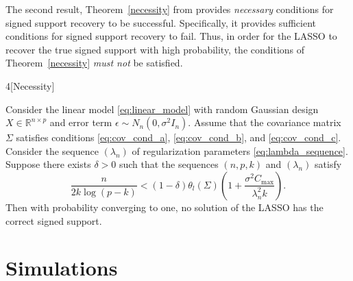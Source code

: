 \documentclass[letterpaper,12pt]{article}
\begin{document}
The second result, Theorem~\ref{necessity} from \cite{wainwright06}
provides \emph{necessary} conditions for signed support recovery to be
successful. Specifically, it provides sufficient conditions for signed
support recovery to fail. Thus, in order for the LASSO to recover the
true signed support with high probability, the conditions of
Theorem~\ref{necessity} \emph{must not} be satisfied.
\begin{customthm}{4}[Necessity] \label{necessity}

  Consider the linear model \eqref{eq:linear_model} with random
  Gaussian design $X \in \mathbb{R}^{n \times p}$ and error term
  $\epsilon \sim N_n(0, \sigma^2 I_n)$. Assume that the covariance
  matrix $\Sigma$ satisfies conditions \eqref{eq:cov_cond_a},
  \eqref{eq:cov_cond_b}, and \eqref{eq:cov_cond_c}. Consider the
  sequence $(\lambda_n)$ of regularization parameters
  \eqref{eq:lambda_sequence}. Suppose there exists $\delta > 0$ such
  that the sequences $(n, p, k)$ and $(\lambda_n)$ satisfy
  \begin{equation*}
    \frac{n}{2k \log (p - k)}
      < (1 - \delta) \theta_l(\Sigma)
        \left ( 1 + \frac{\sigma^2 C_{\mathrm{max}}}{\lambda_n^2 k}
        \right ).
  \end{equation*}
  Then with probability converging to one, no solution of the LASSO
  has the correct signed support.
\end{customthm}

\section*{Simulations}
\end{document}
